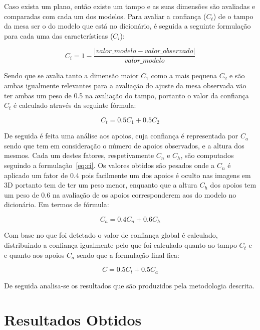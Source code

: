 Caso exista um plano, então existe um tampo e as suas dimensões são avaliadas e comparadas com cada um dos modelos. Para avaliar a confiança (\(C_t\)) de o tampo da mesa ser o do modelo que está no dicionário, é seguida a seguinte formulação para cada uma das características (\(C_i\)):

\begin{equation}\label{eq:ci}
C_i = 1 - \frac{|valor\_modelo - valor\_observado|}{valor\_modelo}
\end{equation}

Sendo que se avalia tanto a dimensão maior \(C_1\) como a mais pequena  \(C_2\) e são ambas igualmente relevantes para a avaliação do ajuste da mesa observada vão ter ambas um peso de 0.5 na avaliação do tampo, portanto o valor da confiança \(C_t\) é calculado através da seguinte fórmula:

\begin{equation}\label{eq:ct}
C_t = 0.5C_1 + 0.5C_2
\end{equation}

De seguida é feita uma análise aos apoios, cuja confiança é representada por \(C_a\) sendo que tem em consideração o número de apoios observados, e a altura dos mesmos. Cada um destes fatores, respetivamente \(C_n\) e \(C_h\), são computados seguindo a formulação~\ref{eq:ci}. Os valores obtidos são pesados onde a \(C_n\) é aplicado um fator de 0.4 pois facilmente um dos apoios é oculto nas imagens em 3D portanto tem de ter um peso menor, enquanto que a altura \(C_h\) dos apoios tem um peso de 0.6 na avaliação de os apoios corresponderem aos do modelo no dicionário. Em termos de fórmula:

\begin{equation}\label{eq:ca}
C_a = 0.4C_n + 0.6C_h
\end{equation}


Com base no que foi detetado o valor de confiança global é calculado, distribuindo a confiança igualmente pelo que foi calculado quanto ao tampo \(C_t\) e e quanto aos apoios \(C_a\) sendo que a formulação final fica:

\begin{equation}\label{eq:cfinal}
C = 0.5C_t + 0.5C_a
\end{equation}

De seguida analisa-se os resultados que são produzidos pela metodologia descrita.

\section {Resultados Obtidos}

